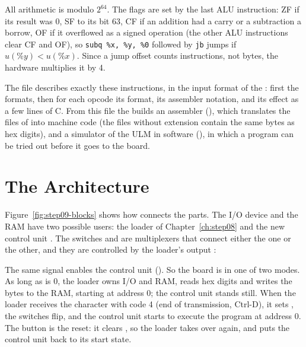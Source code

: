 All arithmetic is modulo $2^{64}$. The flags are set by the last ALU
instruction: ZF if its result was 0, SF to its bit 63, CF if an addition had a
carry or a subtraction a borrow, OF if it overflowed as a signed operation (the
other ALU instructions clear CF and OF), so \texttt{subq \%x, \%y, \%0} followed by \texttt{jb}
jumps if $u(\%y) < u(\%x)$. Since a jump offset counts instructions, not
bytes, the hardware multiplies it by 4.

The file  describes exactly these instructions, in the
input format of the : first the formats, then for each
opcode its format, its assembler notation, and its effect as a few lines of C.
From this file the  builds an assembler (), which
translates the  files of  into machine code (the files
without extension contain the same bytes as hex digits), and a simulator of
the ULM in software (), in which a program can be tried out before it
goes to the board.

\section{The Architecture}
\label{sec:step09-arch}

Figure~\ref{fig:step09-blocks} shows how  connects the parts. The
I/O device  and the RAM  have two possible users: the
loader of Chapter~\ref{ch:step08} and the new control unit . The
switches  and  are multiplexers that
connect either the one or the other, and they are controlled by the loader's
output :


The same signal enables the control unit (). So the
board is in one of two modes. As long as  is 0, the loader
owns I/O and RAM, reads hex digits and writes the bytes to the RAM, starting
at address 0; the control unit stands still. When the loader receives the
character with code 4 (end of transmission, Ctrl-D), it sets , the
switches flip, and the control unit starts to execute the program at
address 0. The button  is the reset: it clears , so the
loader takes over again, and puts the control unit back to its start state.

